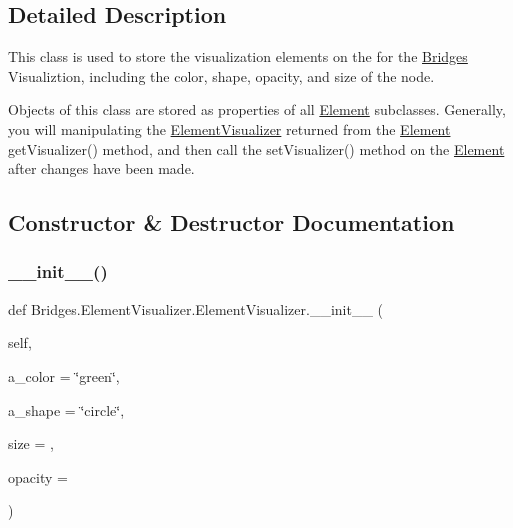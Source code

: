 \subsection{Detailed Description}
This class is used to store the visualization elements on the for the \mbox{\hyperlink{namespace_bridges_1_1_bridges}{Bridges}} Visualiztion, including the color, shape, opacity, and size of the node. 

Objects of this class are stored as properties of all \mbox{\hyperlink{namespace_bridges_1_1_element}{Element}} subclasses. Generally, you will manipulating the \mbox{\hyperlink{class_bridges_1_1_element_visualizer_1_1_element_visualizer}{Element\+Visualizer}} returned from the \mbox{\hyperlink{namespace_bridges_1_1_element}{Element}} get\+Visualizer() method, and then call the set\+Visualizer() method on the \mbox{\hyperlink{namespace_bridges_1_1_element}{Element}} after changes have been made. 

\subsection{Constructor \& Destructor Documentation}
\mbox{\label{class_bridges_1_1_element_visualizer_1_1_element_visualizer_a39ab92e2b3e433aa9f3ebd18ac5e5e29}} 
\subsubsection{\texorpdfstring{\+\_\+\+\_\+init\+\_\+\+\_\+()}{\_\_init\_\_()}}
{\footnotesize\ttfamily def Bridges.\+Element\+Visualizer.\+Element\+Visualizer.\+\_\+\+\_\+init\+\_\+\+\_\+ (\begin{DoxyParamCaption}\item[{}]{self,  }\item[{}]{a\+\_\+color = {\ttfamily \char`\"{}green\char`\"{}},  }\item[{}]{a\+\_\+shape = {\ttfamily \char`\"{}circle\char`\"{}},  }\item[{}]{size = {},  }\item[{}]{opacity = {} }\end{DoxyParamCaption})}



